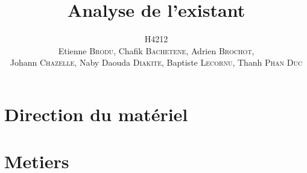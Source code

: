 \documentclass[a4paper,11pt]{report}
\title{Analyse de l'existant}
\author{H4212\\Etienne \textsc{Brodu}, Chafik \textsc{Bachetene}, Adrien \textsc{Brochot},\\Johann \textsc{Chazelle}, Naby Daouda \textsc{Diakite}, Baptiste \textsc{Lecornu}, Thanh \textsc{Phan Duc}}
\begin{document}
\maketitle
\newpage

\tableofcontents
\newpage



\chapter{Direction du matériel}
	
\chapter{Metiers}
	
	
	
\end{document}
